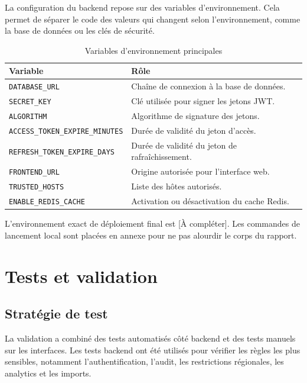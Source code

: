 La configuration du backend repose sur des variables d'environnement. Cela permet de séparer le code des
valeurs qui changent selon l'environnement, comme la base de données ou les clés de sécurité.

\begin{table}[H]
    \centering
    \caption{Variables d'environnement principales}
    \begin{tabular}{L{6.2cm}L{6.8cm}}
        \toprule
        \textbf{Variable} & \textbf{Rôle} \\
        \midrule
        \texttt{DATABASE\_URL} & Chaîne de connexion à la base de données. \\
        \texttt{SECRET\_KEY} & Clé utilisée pour signer les jetons JWT. \\
        \texttt{ALGORITHM} & Algorithme de signature des jetons. \\
        \texttt{ACCESS\_TOKEN\_EXPIRE\_MINUTES} & Durée de validité du jeton d'accès. \\
        \texttt{REFRESH\_TOKEN\_EXPIRE\_DAYS} & Durée de validité du jeton de rafraîchissement. \\
        \texttt{FRONTEND\_URL} & Origine autorisée pour l'interface web. \\
        \texttt{TRUSTED\_HOSTS} & Liste des hôtes autorisés. \\
        \texttt{ENABLE\_REDIS\_CACHE} & Activation ou désactivation du cache Redis. \\
        \bottomrule
    \end{tabular}
\end{table}

L'environnement exact de déploiement final est [À compléter]. Les commandes de lancement local sont
placées en annexe pour ne pas alourdir le corps du rapport.

\section{Tests et validation}

\subsection{Stratégie de test}

La validation a combiné des tests automatisés côté backend et des tests manuels sur les interfaces. Les
tests backend ont été utilisés pour vérifier les règles les plus sensibles, notamment l'authentification,
l'audit, les restrictions régionales, les analytics et les imports.

